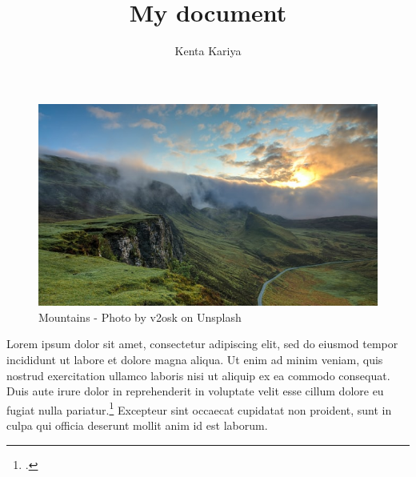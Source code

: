 \documentclass[a4paper,12pt]{article}
\title{My document}
\author{Kenta Kariya}
\begin{document}
\blindtext

\begin{figure}[h]
    \includegraphics[width=\textwidth]{images/mountains}
    \centering
    \caption{Mountains - Photo by v2osk on Unsplash}
\end{figure}

Lorem ipsum dolor sit amet, consectetur adipiscing elit, sed do eiusmod tempor incididunt ut labore et dolore magna aliqua.
Ut enim ad minim veniam, quis nostrud exercitation ullamco laboris nisi ut aliquip ex ea commodo consequat.
Duis aute irure dolor in reprehenderit in voluptate velit esse cillum dolore eu fugiat nulla pariatur.\footcite{ref:mountain}
Excepteur sint occaecat cupidatat non proident, sunt in culpa qui officia deserunt mollit anim id est laborum.
\end{document}
